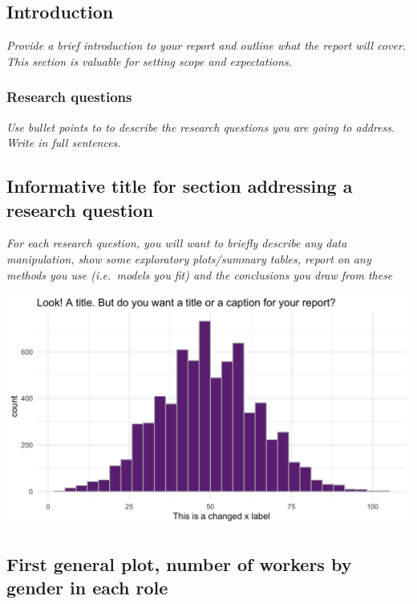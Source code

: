 \documentclass[
          english,
          paper=a4,
              ,captions=tableheading
  ]{scrartcl}
\begin{document}
\hypertarget{introduction}{%
\subsection{Introduction}\label{introduction}}

\emph{Provide a brief introduction to your report and outline what the
report will cover. This section is valuable for setting scope and
expectations. }

\hypertarget{research-questions}{%
\subsubsection{Research questions}\label{research-questions}}

\emph{Use bullet points to to describe the research questions you are
going to address. Write in full sentences.}

\hypertarget{informative-title-for-section-addressing-a-research-question}{%
\subsection{Informative title for section addressing a research
question}\label{informative-title-for-section-addressing-a-research-question}}

\emph{For each research question, you will want to briefly describe any
data manipulation, show some exploratory plots/summary tables, report on
any methods you use (i.e.~models you fit) and the conclusions you draw
from these}

\includegraphics{images/example.png}

\hypertarget{first-general-plot-number-of-workers-by-gender-in-each-role}{%
\subsection{First general plot, number of workers by gender in each
role}\label{first-general-plot-number-of-workers-by-gender-in-each-role}}
\end{document}
